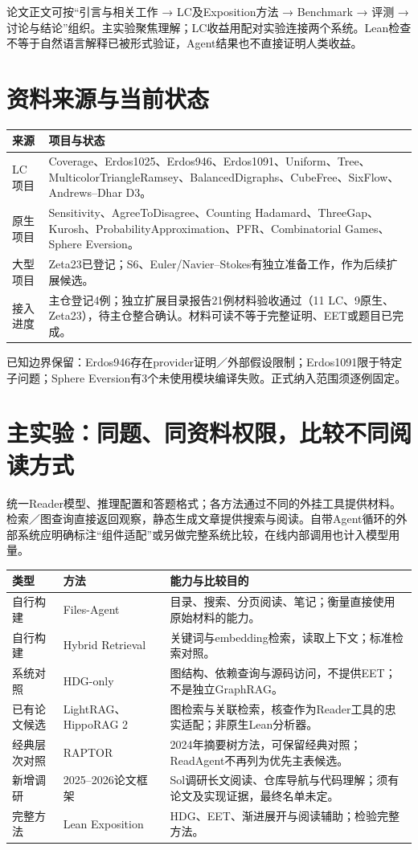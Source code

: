 \documentclass[UTF8,10pt,fontset=none]{ctexart}
\begin{document}
论文正文可按“引言与相关工作 → LC及Exposition方法 → Benchmark → 评测 → 讨论与结论”组织。主实验聚焦理解；LC收益用配对实验连接两个系统。Lean检查不等于自然语言解释已被形式验证，Agent结果也不直接证明人类收益。

\section*{资料来源与当前状态}
\begin{tabularx}{\textwidth}{@{}p{23mm}Y@{}}
\toprule
来源 & 项目与状态 \\
\midrule
LC项目 & Coverage、Erdos1025、Erdos946、Erdos1091、Uniform、Tree、MulticolorTriangleRamsey、BalancedDigraphs、CubeFree、SixFlow、Andrews--Dhar D3。\\
原生项目 & Sensitivity、AgreeToDisagree、Counting Hadamard、ThreeGap、Kurosh、ProbabilityApproximation、PFR、Combinatorial Games、Sphere Eversion。\\
大型项目 & Zeta23已登记；S6、Euler/Navier--Stokes有独立准备工作，作为后续扩展候选。\\
接入进度 & 主仓登记4例；独立扩展目录报告21例材料验收通过（11 LC、9原生、Zeta23），待主仓整合确认。材料可读不等于完整证明、EET或题目已完成。\\
\bottomrule
\end{tabularx}

{\small 已知边界保留：Erdos946存在provider证明／外部假设限制；Erdos1091限于特定子问题；Sphere Eversion有3个未使用模块编译失败。正式纳入范围须逐例固定。}

\newpage
\begingroup\small
\section*{主实验：同题、同资料权限，比较不同阅读方式}
统一Reader模型、推理配置和答题格式；各方法通过不同的外挂工具提供材料。检索／图查询直接返回观察，静态生成文章提供搜索与阅读。自带Agent循环的外部系统应明确标注“组件适配”或另做完整系统比较，在线内部调用也计入模型用量。

\begin{tabularx}{\textwidth}{@{}p{25mm}p{42mm}Y@{}}
\toprule
类型 & 方法 & 能力与比较目的 \\
\midrule
自行构建 & Files-Agent & 目录、搜索、分页阅读、笔记；衡量直接使用原始材料的能力。\\
自行构建 & Hybrid Retrieval & 关键词与embedding检索，读取上下文；标准检索对照。\\
系统对照 & HDG-only & 图结构、依赖查询与源码访问，不提供EET；不是独立GraphRAG。\\
已有论文候选 & LightRAG、HippoRAG 2 & 图检索与关联检索，核查作为Reader工具的忠实适配；非原生Lean分析器。\\
经典层次对照 & RAPTOR & 2024年摘要树方法，可保留经典对照；ReadAgent不再列为优先主表候选。\\
新增调研 & 2025--2026论文框架 & Sol调研长文阅读、仓库导航与代码理解；须有论文及实现证据，最终名单未定。\\
完整方法 & Lean Exposition & HDG、EET、渐进展开与阅读辅助；检验完整方法。\\
\bottomrule
\end{tabularx}
\end{document}

